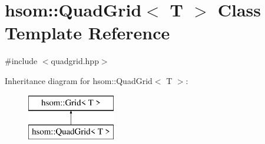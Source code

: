 \hypertarget{classhsom_1_1_quad_grid}{\section{hsom\-:\-:\-Quad\-Grid$<$ \-T $>$ \-Class \-Template \-Reference}
\label{classhsom_1_1_quad_grid}
}


{\ttfamily \#include $<$quadgrid.\-hpp$>$}

\-Inheritance diagram for hsom\-:\-:\-Quad\-Grid$<$ \-T $>$\-:\begin{figure}[H]
\begin{center}
\leavevmode
\includegraphics[height=2.000000cm]{classhsom_1_1_quad_grid}
\end{center}
\end{figure}
